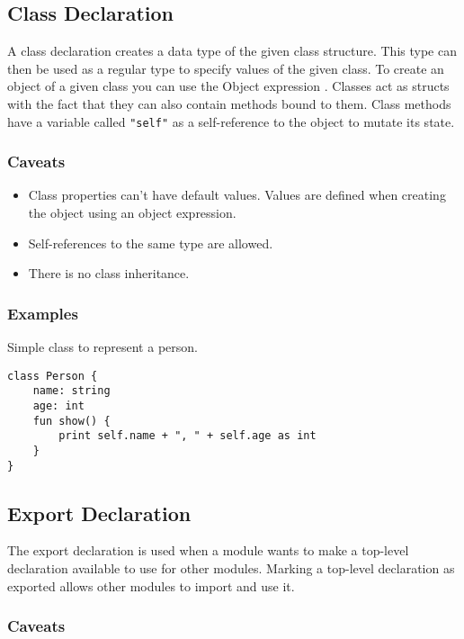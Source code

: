 \subsection{Class Declaration}

A class declaration creates a data type of the given class structure. This type can then be used as a regular type
to specify values of the given class. To create an object of a given class you can use the Object expression \autocite{sec:object_expression}.
Classes act as structs with the fact that they can also contain methods bound to them. Class methods have a variable called \texttt{"self"}
as a self-reference to the object to mutate its state.

\subsubsection{Caveats}

\begin{itemize}
    \item Class properties can't have default values. Values are defined when creating the object using an object expression.
    \item Self-references to the same type are allowed.
    \item There is no class inheritance.
\end{itemize}

\subsubsection{Examples}

Simple class to represent a person.
\begin{lstlisting}
class Person {
    name: string
    age: int
    fun show() {
        print self.name + ", " + self.age as int
    }
}
\end{lstlisting}

\subsection{Export Declaration}

The export declaration is used when a module wants to make a top-level declaration available to use for other
modules. Marking a top-level declaration as exported allows other modules to import and use it.

\subsubsection{Caveats}


